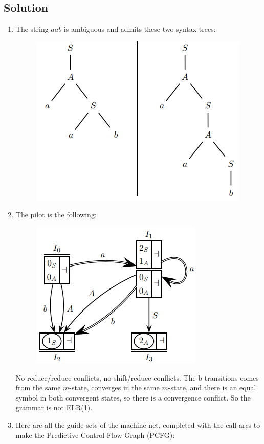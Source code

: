 \documentclass[12pt, a4paper]{report}
\newtheorem[style=M,bodystyle=\normalfont]{theorem}{Theorem}
\newtheorem[style=M,bodystyle=\normalfont]{corollary}{Corollary}
\newtheorem[style=M,bodystyle=\normalfont]{lemma}{Lemma}
\newtheorem[style=M,bodystyle=\normalfont]{definition}{Definition}
\begin{document}
    \subsection*{Solution}
        \begin{enumerate}
            \item The string $a a b$ is ambiguous and admits these two syntax trees:
                \begin{figure}[H]
                    \centering
                    \includegraphics[width=0.5\linewidth]{images/syntax.png}
                \end{figure} 
            \item The pilot is the following: 
                \begin{figure}[H]
                    \centering
                    \includegraphics[width=0.5\linewidth]{images/synsol.png}
                \end{figure} 
                No reduce/reduce conflicts, no shift/reduce conflicts. The b transitions comes from the same $m$-state, converges in the same $m$-state, and there is 
                an equal symbol in both convergent states, so there is a convergence conflict. So the grammar is not ELR(1). 
            \item Here are all the guide sets of the machine net, completed with the call arcs to make the Predictive Control Flow Graph (PCFG):
                \begin{figure}[H]

\end{figure}
\end{enumerate}
\end{document}
